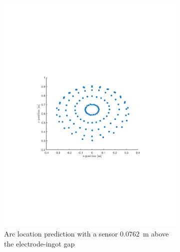 \documentclass[onehalf,11pt]{beavtex}
\begin{document}
\begin{figure}[htbp]
\begin{subfigure}[b]{0.495\textwidth}
	\includegraphics[width=\textwidth]{sh2.pdf}
	\caption{Arc location prediction with a sensor \SI{0.0762}{\meter} above the electrode-ingot gap}
	\end{subfigure}
	\\
	\begin{subfigure}[b]{0.495\textwidth}

\end{subfigure}
\end{figure}
\end{document}
